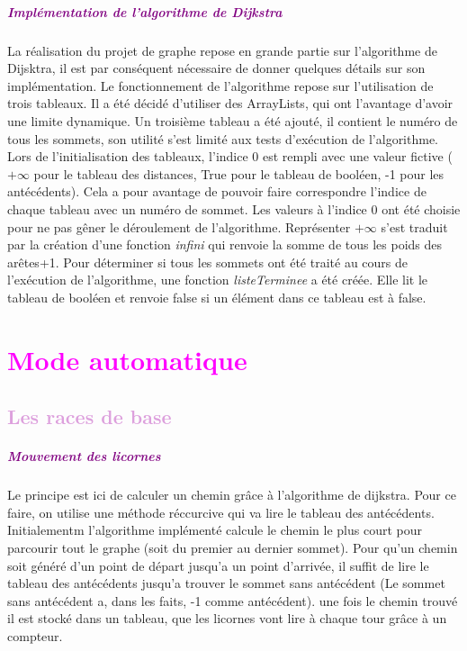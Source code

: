 \documentclass{report}
\begin{document}
      \paragraph{\textcolor{purple}{Implémentation de l'algorithme de Dijkstra}}
      La réalisation du projet de graphe repose en grande partie sur l'algorithme de Dijsktra, il est par conséquent nécessaire de donner quelques détails sur son implémentation. 
      Le fonctionnement de l'algorithme repose sur l'utilisation de trois tableaux. Il a été décidé d'utiliser des ArrayLists, qui ont l'avantage d'avoir une limite dynamique. Un troisième tableau a été ajouté, il contient le numéro de tous les sommets, son utilité s'est limité aux tests d'exécution de l'algorithme.
      Lors de l'initialisation des tableaux, l'indice 0 est rempli avec une valeur fictive ($+\infty$ pour le tableau des distances, True pour le tableau de booléen, -1 pour les antécédents). Cela a pour avantage de pouvoir faire correspondre l'indice de chaque tableau avec un numéro de sommet. Les valeurs à l'indice 0 ont été choisie pour ne pas gêner le déroulement de l'algorithme. Représenter $+\infty$ s'est traduit par la création d'une fonction \emph{infini} qui renvoie la somme de tous les poids des arêtes+1.
      Pour déterminer si tous les sommets ont été traité au cours de l'exécution de l'algorithme, une fonction \emph{listeTerminee} a été créée. Elle lit le tableau de booléen et renvoie false si un élément dans ce tableau est à false.
       
			
			
			
	\chapter*{\textcolor{Fuchsia}{Mode automatique}}
		\section*{\textcolor{Plum}{Les races de base}}
			\paragraph{\textcolor{purple}{Mouvement des licornes}}
			Le principe est ici de calculer un chemin gr\^ace \`a l'algorithme de dijkstra. Pour ce faire, on utilise une m\'ethode r\'eccurcive qui va lire le tableau des ant\'ec\'edents. Initialementm l'algorithme impl\'ement\'e calcule le chemin le plus court pour parcourir tout le graphe (soit du premier au dernier sommet). Pour qu'un chemin soit g\'en\'er\'e d'un point de d\'epart jusqu'a un point d'arriv\'ee, il suffit de lire le tableau des ant\'ec\'edents jusqu'a trouver le sommet sans ant\'ec\'edent (Le sommet sans ant\'ec\'edent a, dans les faits, -1 comme ant\'ec\'edent). une fois le chemin trouv\'e il est stock\'e dans un tableau, que les licornes vont lire \`a chaque tour gr\^ace \`a un compteur.
\end{document}
